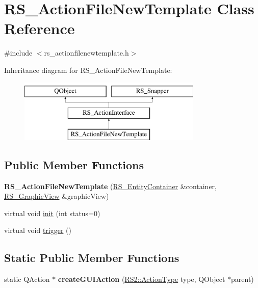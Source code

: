 \hypertarget{classRS__ActionFileNewTemplate}{\section{R\-S\-\_\-\-Action\-File\-New\-Template Class Reference}
\label{classRS__ActionFileNewTemplate}
}


{\ttfamily \#include $<$rs\-\_\-actionfilenewtemplate.\-h$>$}

Inheritance diagram for R\-S\-\_\-\-Action\-File\-New\-Template\-:\begin{figure}[H]
\begin{center}
\leavevmode
\includegraphics[height=3.000000cm]{classRS__ActionFileNewTemplate}
\end{center}
\end{figure}
\subsection*{Public Member Functions}
\begin{DoxyCompactItemize}
\item 
\hypertarget{classRS__ActionFileNewTemplate_a29b8eb6ecb53cdddb325549b051c1d72}{{\bfseries R\-S\-\_\-\-Action\-File\-New\-Template} (\hyperlink{classRS__EntityContainer}{R\-S\-\_\-\-Entity\-Container} \&container, \hyperlink{classRS__GraphicView}{R\-S\-\_\-\-Graphic\-View} \&graphic\-View)}\label{classRS__ActionFileNewTemplate_a29b8eb6ecb53cdddb325549b051c1d72}

\item 
virtual void \hyperlink{classRS__ActionFileNewTemplate_a13966d66a1df8a021d2935875e509f36}{init} (int status=0)
\item 
virtual void \hyperlink{classRS__ActionFileNewTemplate_af02b8417a50cc1f8e97398c7997c9a5c}{trigger} ()
\end{DoxyCompactItemize}
\subsection*{Static Public Member Functions}
\begin{DoxyCompactItemize}
\item 
\hypertarget{classRS__ActionFileNewTemplate_a8fbd841835989ed3a941f7bf8e3ed3df}{static Q\-Action $\ast$ {\bfseries create\-G\-U\-I\-Action} (\hyperlink{classRS2_afe3523e0bc41fd637b892321cfc4b9d7}{R\-S2\-::\-Action\-Type} type, Q\-Object $\ast$parent)}\label{classRS__ActionFileNewTemplate_a8fbd841835989ed3a941f7bf8e3ed3df}

\end{DoxyCompactItemize}
